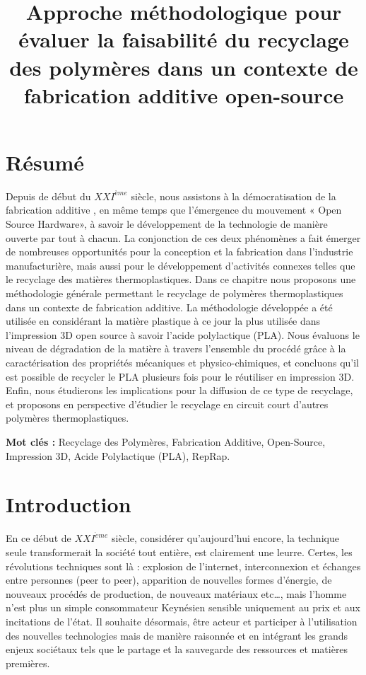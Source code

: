 \documentclass[
]{article}
\title{Approche méthodologique pour évaluer la faisabilité du recyclage des polymères dans un contexte de fabrication additive open-source}
\author{}
\date{\vspace{-2.5em}}
\begin{document}
\maketitle

{
\hypersetup{linkcolor=}
\setcounter{tocdepth}{2}
\tableofcontents
}
\hypertarget{ruxe9sumuxe9}{%
\section*{Résumé}\label{ruxe9sumuxe9}}

Depuis de début du \(XXI^{ème}\) siècle, nous assistons à la démocratisation de la fabrication additive , en même temps que l'émergence du mouvement « Open Source Hardware», à savoir le développement de la technologie de manière ouverte par tout à chacun. La conjonction de ces deux phénomènes a fait émerger de nombreuses opportunités pour la conception et la fabrication dans l'industrie manufacturière, mais aussi pour le développement d'activités connexes telles que le recyclage des matières thermoplastiques. Dans ce chapitre nous proposons une méthodologie générale permettant le recyclage de polymères thermoplastiques dans un contexte de fabrication additive. La méthodologie développée a été utilisée en considérant la matière plastique à ce jour la plus utilisée dans l'impression 3D open source à savoir l'acide polylactique (PLA). Nous évaluons le niveau de dégradation de la matière à travers l'ensemble du procédé grâce à la caractérisation des propriétés mécaniques et physico-chimiques, et concluons qu'il est possible de recycler le PLA plusieurs fois pour le réutiliser en impression 3D. Enfin, nous étudierons les implications pour la diffusion de ce type de recyclage, et proposons en perspective d'étudier le recyclage en circuit court d'autres polymères thermoplastiques.

\textbf{Mot clés :} Recyclage des Polymères, Fabrication Additive, Open-Source, Impression 3D, Acide Polylactique (PLA), RepRap.

\hypertarget{introduction}{%
\section{Introduction}\label{introduction}}

En ce début de \(XXI^{\grave{e}me}\) siècle, considérer qu'aujourd'hui encore, la technique seule transformerait la société tout entière, est clairement une leurre. Certes, les révolutions techniques sont là : explosion de l'internet, interconnexion et échanges entre personnes (peer to peer), apparition de nouvelles formes d'énergie, de nouveaux procédés de production, de nouveaux matériaux etc\ldots, mais l'homme n'est plus un simple consommateur Keynésien sensible uniquement au prix et aux incitations de l'état. Il souhaite désormais, être acteur et participer à l'utilisation des nouvelles technologies mais de manière raisonnée et en intégrant les grands enjeux sociétaux tels que le partage et la sauvegarde des ressources et matières premières.
\end{document}
